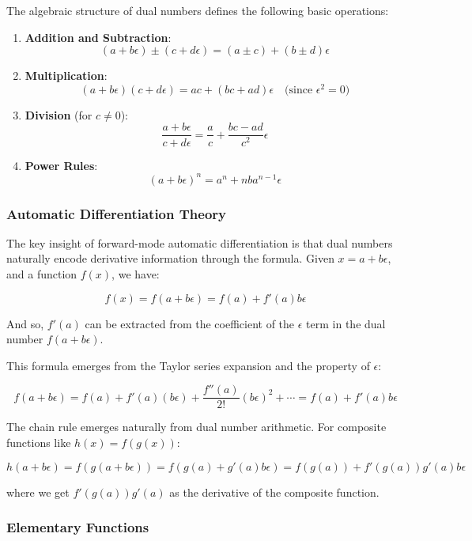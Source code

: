\documentclass{article}
\begin{document}
The algebraic structure of dual numbers defines the following basic operations:

\begin{enumerate}
    \item \textbf{Addition and Subtraction}: 
    \[
    (a + b\epsilon) \pm (c + d\epsilon) = (a \pm c) + (b \pm d)\epsilon
    \]
    
    \item \textbf{Multiplication}: 
    \[
    (a + b\epsilon)(c + d\epsilon) = ac + (bc + ad)\epsilon \quad \text{(since $\epsilon^2 = 0$)}
    \]

    \item \textbf{Division} (for $c \neq 0$): 
    \[
    \frac{a + b\epsilon}{c + d\epsilon} = \frac{a}{c} + \frac{bc - ad}{c^2}\epsilon
    \]

    \item \textbf{Power Rules}: 
    \[
    (a + b\epsilon)^n = a^n + nba^{n-1}\epsilon
    \]
\end{enumerate}

\subsubsection*{Automatic Differentiation Theory}

The key insight of forward-mode automatic differentiation is that dual numbers naturally encode derivative information through the formula. Given $x = a + b\epsilon$, and a function $f(x)$, we have:

\[
f(x) = f(a + b\epsilon) = f(a) + f'(a)b\epsilon
\]

And so, $f'(a)$ can be extracted from the coefficient of the $\epsilon$ term in the dual number $f(a + b\epsilon)$.

This formula emerges from the Taylor series expansion and the property of $\epsilon$:

\[
f(a + b\epsilon) = f(a) + f'(a)(b\epsilon) + \frac{f''(a)}{2!}(b\epsilon)^2 + \cdots = f(a) + f'(a)b\epsilon
\]

The chain rule emerges naturally from dual number arithmetic. For composite functions like $h(x) = f(g(x))$:

\[
h(a + b\epsilon) = f(g(a + b\epsilon)) = f(g(a) + g'(a)b\epsilon) = f(g(a)) + f'(g(a))g'(a)b\epsilon
\]

where we get $f'(g(a))g'(a)$ as the derivative of the composite function.

\subsubsection*{Elementary Functions}
\end{document}

